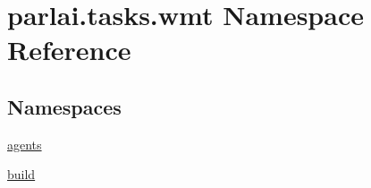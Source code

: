 \hypertarget{namespaceparlai_1_1tasks_1_1wmt}{}\section{parlai.\+tasks.\+wmt Namespace Reference}
\label{namespaceparlai_1_1tasks_1_1wmt}
\subsection*{Namespaces}
\begin{DoxyCompactItemize}
\item 
 \hyperlink{namespaceparlai_1_1tasks_1_1wmt_1_1agents}{agents}
\item 
 \hyperlink{namespaceparlai_1_1tasks_1_1wmt_1_1build}{build}
\end{DoxyCompactItemize}
